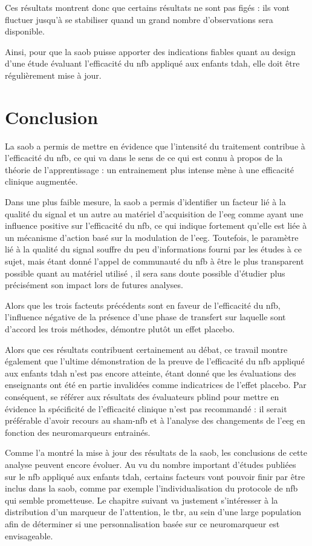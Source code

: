 Ces résultats montrent donc que certains résultats ne sont pas figés : ils vont fluctuer jusqu'à se stabiliser quand un grand nombre d'observations sera disponible. 

Ainsi, pour que la \gls{saob} puisse apporter des indications fiables quant au design d'une étude évaluant l'efficacité du \gls{nfb} appliqué aux enfants \gls{tdah}, elle doit être 
régulièrement mise à jour. 

\section{Conclusion}

La \gls{saob} a permis de mettre en évidence que l'intensité du traitement contribue à l'efficacité du \gls{nfb}, ce qui va dans le sens de ce qui est connu à propos de 
la théorie de l'apprentissage \citep{Mowrer1960} : un entrainement plus intense mène à une efficacité clinique augmentée. 

Dans une plus faible mesure, la \gls{saob} a permis d'identifier un facteur lié à la qualité du signal et un autre au matériel d'acquisition de l'\gls{eeg} comme ayant une influence positive 
sur l'efficacité du \gls{nfb}, ce qui indique fortement qu'elle est liée à un mécanisme d'action basé sur la modulation de l'\gls{eeg}. Toutefois, le paramètre lié à la qualité du signal 
souffre du peu d'informations fourni par les études à ce sujet, mais étant donné l'appel de
communauté du \gls{nfb} à être le plus transparent possible quant au matériel utilisé \citep{Ros2019}, il sera sans doute possible d'étudier plus précisément
son impact lors de futures analyses.

Alors que les trois facteuts précédents sont en faveur de l'efficacité du \gls{nfb}, l'influence négative de la présence d'une phase de transfert sur laquelle sont d'accord les trois méthodes, 
démontre plutôt un effet placebo. 

Alors que ces résultats contribuent certainement au débat, ce travail montre également que l'ultime démonstration de la preuve de l'efficacité du \gls{nfb}
appliqué aux enfants \gls{tdah} n'est pas encore atteinte, étant donné que les évaluations des enseignants ont été en partie invalidées comme indicatrices de 
l'effet placebo. Par conséquent, se référer aux résultats des évaluateurs \gls{pblind} pour mettre en évidence la spécificité de l'efficacité clinique n'est pas 
recommandé : il serait préférable d'avoir recours au sham-\gls{nfb} et à l'analyse des changements de l'\gls{eeg} en fonction des neuromarqueurs entrainés.

Comme l'a montré la mise à jour des résultats de la \gls{saob}, les conclusions de cette analyse peuvent encore évoluer. Au vu du nombre important 
d'études publiées sur le \gls{nfb} appliqué aux enfants \gls{tdah}, certains facteurs vont pouvoir finir par être inclus dans la \gls{saob}, comme par exemple 
l'individualisation du protocole de \gls{nfb} qui semble prometteuse. Le chapitre suivant va justement s'intéresser à la distribution d'un marqueur de l'attention, 
le \gls{tbr}, au sein d'une large population afin de déterminer si une personnalisation basée sur ce neuromarqueur est envisageable.




 